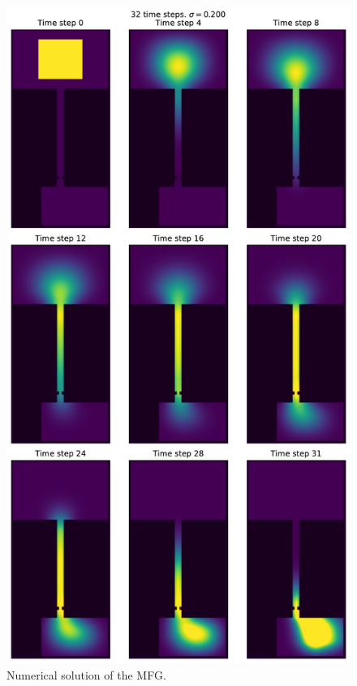 \documentclass[../report.tex]{subfiles}
\begin{document}
\begin{figure}
	\centering
	\includegraphics[height=\textheight]{../project/images/multimarg_room2/multimarg_transport.pdf}
	\caption{Numerical solution of the MFG.}\label{fig:NMarg1Steps}
\end{figure}
\end{document}
